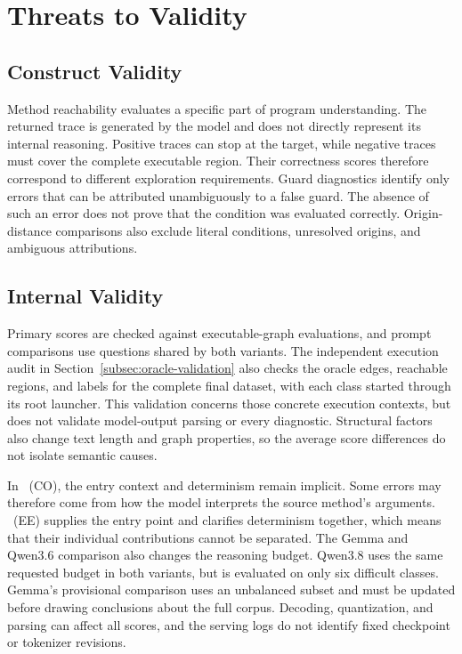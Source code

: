 \section{Threats to Validity}
\label{sec:threats}

\subsection{Construct Validity}

Method reachability evaluates a specific part of program understanding. The returned trace is generated by the model and does not directly represent its internal reasoning. Positive traces can stop at the target, while negative traces must cover the complete executable region. Their correctness scores therefore correspond to different exploration requirements. Guard diagnostics identify only errors that can be attributed unambiguously to a false guard. The absence of such an error does not prove that the condition was evaluated correctly. Origin-distance comparisons also exclude literal conditions, unresolved origins, and ambiguous attributions.

\subsection{Internal Validity}

Primary scores are checked against executable-graph evaluations, and prompt comparisons use questions shared by both variants. The independent execution audit in Section~\ref{subsec:oracle-validation} also checks the oracle edges, reachable regions, and labels for the complete final dataset, with each class started through its root launcher. This validation concerns those concrete execution contexts, but does not validate model-output parsing or every diagnostic. Structural factors also change text length and graph properties, so the average score differences do not isolate semantic causes.

In \benchmark~(CO), the entry context and determinism remain implicit. Some errors may therefore come from how the model interprets the source method's arguments. \benchmark~(EE) supplies the entry point and clarifies determinism together, which means that their individual contributions cannot be separated. The Gemma and Qwen3.6 comparison also changes the reasoning budget. Qwen3.8 uses the same requested budget in both variants, but is evaluated on only six difficult classes. Gemma's provisional comparison uses an unbalanced subset and must be updated before drawing conclusions about the full corpus. Decoding, quantization, and parsing can affect all scores, and the serving logs do not identify fixed checkpoint or tokenizer revisions.

